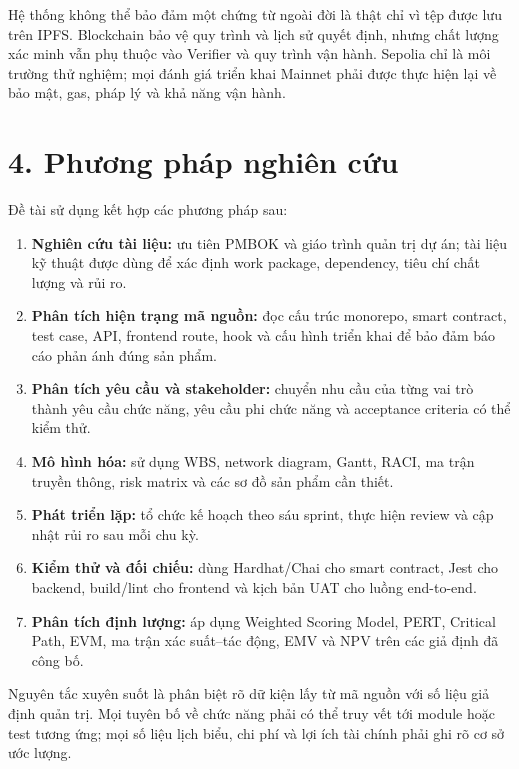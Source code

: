 Hệ thống không thể bảo đảm một chứng từ ngoài đời là thật chỉ vì tệp được lưu trên IPFS. Blockchain bảo vệ quy trình và lịch sử quyết định, nhưng chất lượng xác minh vẫn phụ thuộc vào Verifier và quy trình vận hành. Sepolia chỉ là môi trường thử nghiệm; mọi đánh giá triển khai Mainnet phải được thực hiện lại về bảo mật, gas, pháp lý và khả năng vận hành.

\section*{4. Phương pháp nghiên cứu}

Đề tài sử dụng kết hợp các phương pháp sau:

\begin{enumerate}
  \item \textbf{Nghiên cứu tài liệu:} ưu tiên PMBOK và giáo trình quản trị dự án; tài liệu kỹ thuật được dùng để xác định work package, dependency, tiêu chí chất lượng và rủi ro.
  \item \textbf{Phân tích hiện trạng mã nguồn:} đọc cấu trúc monorepo, smart contract, test case, API, frontend route, hook và cấu hình triển khai để bảo đảm báo cáo phản ánh đúng sản phẩm.
  \item \textbf{Phân tích yêu cầu và stakeholder:} chuyển nhu cầu của từng vai trò thành yêu cầu chức năng, yêu cầu phi chức năng và acceptance criteria có thể kiểm thử.
  \item \textbf{Mô hình hóa:} sử dụng WBS, network diagram, Gantt, RACI, ma trận truyền thông, risk matrix và các sơ đồ sản phẩm cần thiết.
  \item \textbf{Phát triển lặp:} tổ chức kế hoạch theo sáu sprint, thực hiện review và cập nhật rủi ro sau mỗi chu kỳ.
  \item \textbf{Kiểm thử và đối chiếu:} dùng Hardhat/Chai cho smart contract, Jest cho backend, build/lint cho frontend và kịch bản UAT cho luồng end-to-end.
  \item \textbf{Phân tích định lượng:} áp dụng Weighted Scoring Model, PERT, Critical Path, EVM, ma trận xác suất--tác động, EMV và NPV trên các giả định đã công bố.
\end{enumerate}

Nguyên tắc xuyên suốt là phân biệt rõ dữ kiện lấy từ mã nguồn với số liệu giả định quản trị. Mọi tuyên bố về chức năng phải có thể truy vết tới module hoặc test tương ứng; mọi số liệu lịch biểu, chi phí và lợi ích tài chính phải ghi rõ cơ sở ước lượng.

